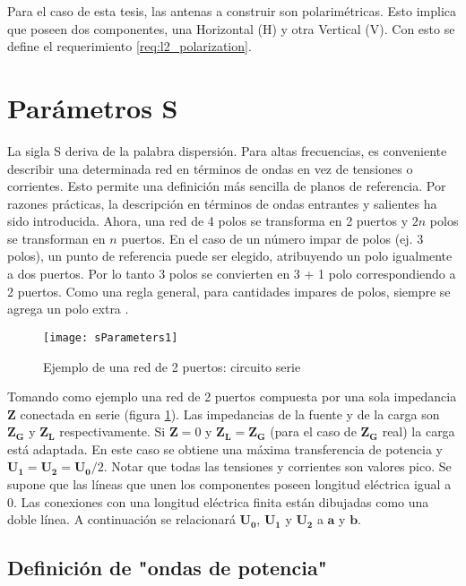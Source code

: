 Para el caso de esta tesis, las antenas a construir son polarimétricas. Esto implica que poseen dos componentes, una Horizontal (H) y otra Vertical (V). Con esto se define el requerimiento \ref{req:l2_polarization}.


\section{Parámetros S} 

La sigla S deriva de la palabra dispersión. Para altas frecuencias, es conveniente describir una determinada red en términos de ondas en vez de tensiones o corrientes. Esto permite una definición más sencilla de planos de referencia. Por razones prácticas, la descripción en términos de ondas entrantes y salientes ha sido introducida. Ahora, una red de 4 polos se transforma en 2 puertos y $2n$ polos se transforman en $n$ puertos. En el caso de un número impar de polos (ej. 3 polos), un punto de referencia puede ser elegido, atribuyendo un polo igualmente a dos puertos. Por lo tanto 3 polos se convierten en 3 + 1 polo correspondiendo a 2 puertos. Como una regla general, para cantidades impares de polos, siempre se agrega un polo extra \cite{Caspers}.

\begin{figure}[H]
 \centering
 \texttt{[image: sParameters1]}
 \caption{Ejemplo de una red de 2 puertos: circuito serie \cite{Caspers}}
 \label{fig:esquema_serie}
\end{figure}

Tomando como ejemplo una red de 2 puertos compuesta por una sola impedancia $\bm{Z}$ conectada en serie (figura \ref{fig:esquema_serie}). Las impedancias de la fuente y de la carga son $\bm{Z_G}$ y $\bm{Z_L}$ respectivamente. Si $\bm{Z}=0$ y $\bm{Z_L} = \bm{Z_G}$ (para el caso de $\bm{Z_G}$ real) la carga está adaptada. En este caso se obtiene una máxima transferencia de potencia y $\bm{U_1} = \bm{U_2} = \bm{U_0}/2$. Notar que todas las tensiones y corrientes son valores pico. Se supone que las líneas que unen los componentes poseen longitud eléctrica igual a 0. Las conexiones con una longitud eléctrica finita están dibujadas como una doble línea. A continuación se relacionará $\bm{U_0}$, $\bm{U_1}$ y $\bm{U_2}$ a $\bm{a}$ y $\bm{b}$.


\subsection{Definición de "ondas de potencia"}

